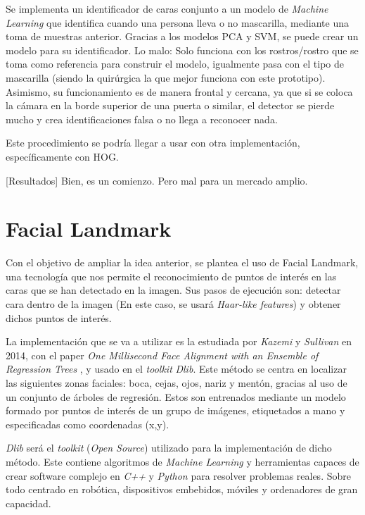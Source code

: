 Se implementa un identificador de caras conjunto a un modelo de \textit{Machine Learning} que identifica cuando una persona lleva o no mascarilla, mediante una toma de muestras anterior. Gracias a los modelos PCA y SVM, se puede crear un modelo para su identificador.
Lo malo: Solo funciona con los rostros/rostro que se toma como referencia para construir el modelo, igualmente pasa con el tipo de mascarilla (siendo la quirúrgica la que mejor funciona con este prototipo). Asimismo, su funcionamiento es de manera frontal y cercana, ya que si se coloca la cámara en la borde superior de una puerta o similar, el detector se pierde mucho y crea identificaciones falsa o no llega a reconocer nada.

Este procedimiento se podría llegar a usar con otra implementación, específicamente con HOG. 

[Resultados]
Bien, es un comienzo. Pero mal para un mercado amplio.

\newpage
\section{Facial Landmark}

Con el objetivo de ampliar la idea anterior, se plantea el uso de Facial Landmark, una tecnología que nos permite el reconocimiento de puntos de interés en las caras que se han detectado en la imagen. Sus pasos de ejecución son: detectar cara dentro de la imagen (En este caso, se usará \textit{Haar-like features}) y obtener dichos puntos de interés.

La implementación que se va a utilizar es la estudiada por \textit{Kazemi} y \textit{Sullivan} en 2014, con el paper \textit{One Millisecond Face Alignment with an Ensemble of Regression Trees} \cite{inproceedings}, y usado en el \textit{toolkit} \textit{Dlib}. Este método se centra en localizar las siguientes zonas faciales: boca, cejas, ojos, nariz y mentón, gracias al uso de un conjunto de árboles de regresión. Estos son entrenados mediante  un modelo formado por puntos de interés de un grupo de imágenes, etiquetados a mano y especificadas como coordenadas (x,y). 

\textit{Dlib} será el \textit{toolkit} (\textit{Open Source}) utilizado para la implementación de dicho método. Este contiene algoritmos de \textit{Machine Learning} y herramientas capaces de crear software complejo en \textit{C++} y \textit{Python} para resolver problemas reales. Sobre todo centrado en robótica, dispositivos embebidos, móviles y ordenadores de gran capacidad. \cite{dlib}

